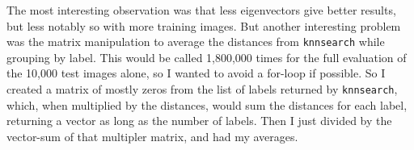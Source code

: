 \documentclass[11pt]{report}
\begin{document}
The most interesting observation was that less eigenvectors give better results, but less notably so with more training images. But another interesting problem was the matrix manipulation to average the distances from \texttt{knnsearch} while grouping by label. This would be called 1,800,000 times for the full evaluation of the 10,000 test images alone, so I wanted to avoid a for-loop if possible. So I created a matrix of mostly zeros from the list of labels returned by \texttt{knnsearch}, which, when multiplied by the distances, would sum the distances for each label, returning a vector as long as the number of labels. Then I just divided by the vector-sum of that multipler matrix, and had my averages.
\end{document}
